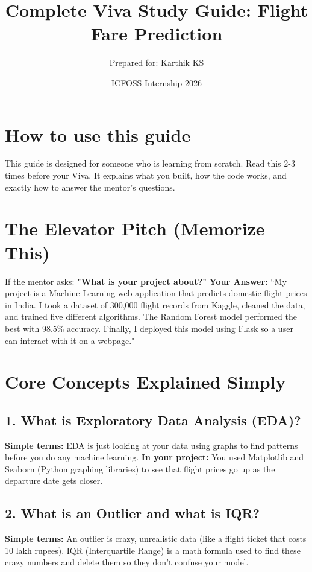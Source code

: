 \documentclass[12pt]{article}
\title{\textbf{Complete Viva Study Guide: Flight Fare Prediction}}
\author{Prepared for: Karthik KS}
\date{ICFOSS Internship 2026}
\begin{document}
\maketitle

\section*{How to use this guide}
This guide is designed for someone who is learning from scratch. Read this 2-3 times before your Viva. It explains what you built, how the code works, and exactly how to answer the mentor's questions.

\section{The Elevator Pitch (Memorize This)}
If the mentor asks: \textbf{"What is your project about?"}
\newline
\textbf{Your Answer:} ``My project is a Machine Learning web application that predicts domestic flight prices in India. I took a dataset of 300,000 flight records from Kaggle, cleaned the data, and trained five different algorithms. The Random Forest model performed the best with 98.5\% accuracy. Finally, I deployed this model using Flask so a user can interact with it on a webpage."

\section{Core Concepts Explained Simply}

\subsection*{1. What is Exploratory Data Analysis (EDA)?}
\textbf{Simple terms:} EDA is just looking at your data using graphs to find patterns before you do any machine learning.
\newline \textbf{In your project:} You used Matplotlib and Seaborn (Python graphing libraries) to see that flight prices go up as the departure date gets closer.

\subsection*{2. What is an Outlier and what is IQR?}
\textbf{Simple terms:} An outlier is crazy, unrealistic data (like a flight ticket that costs 10 lakh rupees). IQR (Interquartile Range) is a math formula used to find these crazy numbers and delete them so they don't confuse your model.
\end{document}
